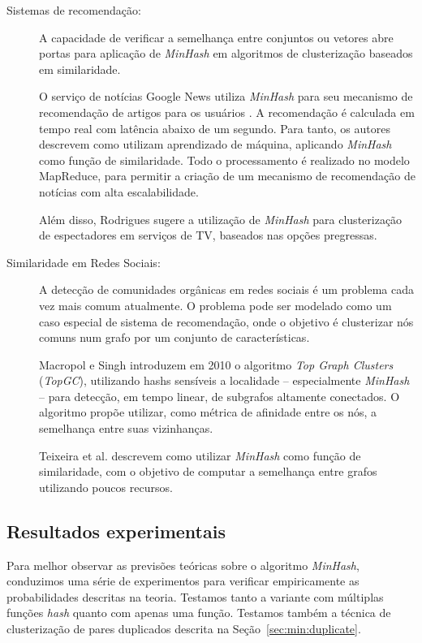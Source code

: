 \begin{description}
\item[Sistemas de recomendação:]

A capacidade de verificar a semelhança entre conjuntos ou vetores abre portas para aplicação de \emph{MinHash} em algoritmos de clusterização baseados em similaridade.

O serviço de notícias Google News utiliza \emph{MinHash} para seu mecanismo de recomendação de artigos para os usuários \cite{das2007google}. A recomendação é calculada em tempo real com latência abaixo de um segundo. Para tanto, os autores descrevem como utilizam aprendizado de máquina, aplicando \emph{MinHash} como função de similaridade. Todo o processamento é realizado no modelo MapReduce, para permitir a criação de um mecanismo de recomendação de notícias com alta escalabilidade.

Além disso, Rodrigues \cite{rodrigues2013recomendaccao} sugere a utilização de \emph{MinHash} para clusterização de espectadores em serviços de TV, baseados nas opções pregressas.

\item[Similaridade em Redes Sociais:]

A detecção de comunidades orgânicas em redes sociais é um problema cada vez mais comum atualmente. O problema pode ser modelado como um caso especial de sistema de recomendação, onde o objetivo é clusterizar nós comuns num grafo por um conjunto de características. 

Macropol e Singh \cite{macropol2010scalable} introduzem em 2010 o algoritmo \emph{Top Graph Clusters} (\emph{TopGC}), utilizando hashs sensíveis a localidade -- especialmente \emph{MinHash} -- para detecção, em tempo linear, de subgrafos altamente conectados. O algoritmo propõe utilizar, como métrica de afinidade entre os nós, a semelhança entre suas vizinhanças.

Teixeira et al. \cite{teixeira2012min} descrevem como utilizar \emph{MinHash} como função de similaridade, com o objetivo de computar a semelhança entre grafos utilizando poucos recursos.


\end{description}

\subsection{Resultados experimentais}\label{sec:min:experiments}

Para melhor observar as previsões teóricas sobre o algoritmo \emph{MinHash}, conduzimos uma série de experimentos para verificar empiricamente as probabilidades descritas na teoria. Testamos tanto a variante com múltiplas funções \emph{hash} quanto com apenas uma função. Testamos também a técnica de clusterização de pares duplicados descrita na Seção~\ref{sec:min:duplicate}.

